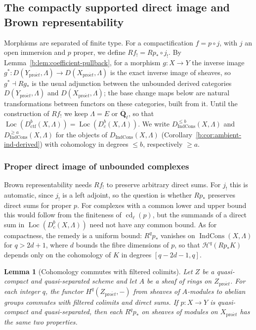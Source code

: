 \documentclass[11pt,a4paper]{article}
\numberwithin{equation}{section}
\newtheorem{lemma}[theorem]{Lemma}
\theoremstyle{definition}
\theoremstyle{remark}
\newcommand{\Dbc}{D^b_c}
\newcommand{\Loc}{\operatorname{Loc}}
\newcommand{\Qbar}{\overline{\mathbf Q}_\ell}
\newcommand{\proet}{\mathrm{pro}\acute{e}t}
\newcommand{\IndCons}{\operatorname{IndCons}}
\newcommand{\Dic}{D_{\IndCons}}
\newcommand{\Dctf}{D^b_{\mathrm{ctf}}}
\begin{document}
\subsection{The compactly supported direct image and Brown representability}
\label{b:sec:brown-construction}

Morphisms are separated of finite type. For a compactification
$f=p\circ j$, with $j$ an open immersion and $p$ proper, we define
$Rf_!=Rp_*\circ j_!$. By
Lemma~\ref{b:lem:coefficient-pullback}, for a morphism $g\colon X\to Y$
the inverse image $g^*\colon D(Y_{\proet},\Lambda)\to D(X_{\proet},\Lambda)$
is the exact inverse image of sheaves, so $g^*\dashv Rg_*$ is the usual
adjunction between the unbounded derived categories
$D(Y_{\proet},\Lambda)$ and $D(X_{\proet},\Lambda)$; the base change maps
below are natural transformations between functors on these categories,
built from it. Until the construction of $Rf_!$ we keep $\Lambda=E$ or
$\Qbar$, so that $\Loc(\Dctf(X,\Lambda))=\Loc(\Dbc(X,\Lambda))$. We write
$\Dic^{\leq b}(X,\Lambda)$ and $\Dic^{\geq a}(X,\Lambda)$ for the objects
of $\Dic(X,\Lambda)$ (Corollary~\ref{b:cor:ambient-ind-derived}) with
cohomology in degrees $\leq b$, respectively $\geq a$.

\subsubsection{Proper direct image of unbounded complexes}

Brown representability needs $Rf_!$ to preserve arbitrary direct sums.
For $j_!$ this is automatic, since $j_!$ is a left adjoint, so the
question is whether $Rp_*$ preserves direct sums for proper $p$. For
complexes with a common lower and upper bound this would follow from the
finiteness of $\operatorname{cd}_\ell(p)$, but the summands of a direct
sum in $\Loc(\Dbc(X,\Lambda))$ need not have any common bound. As for
compactness, the remedy is a uniform bound: $R^qp_*$ vanishes on
$\IndCons(X,\Lambda)$ for $q>2d+1$, where $d$ bounds the fibre dimensions
of $p$, so that $\mathcal H^q(Rp_*K)$ depends only on the cohomology of
$K$ in degrees $[q-2d-1,q]$.

\begin{lemma}[Cohomology commutes with filtered colimits]
\label{b:lem:proper-heart-continuity}
Let $Z$ be a quasi-compact and quasi-separated scheme and let $A$ be a sheaf
of rings on $Z_{\proet}$. For each integer $q$, the functor
$H^q(Z_{\proet},-)$ from sheaves of $A$-modules to abelian groups commutes with filtered colimits and direct
sums. If $p:X\to Y$ is quasi-compact and quasi-separated, then each
$R^qp_*$ on sheaves of modules on $X_{\proet}$ has the same two properties.
\end{lemma}
\end{document}
